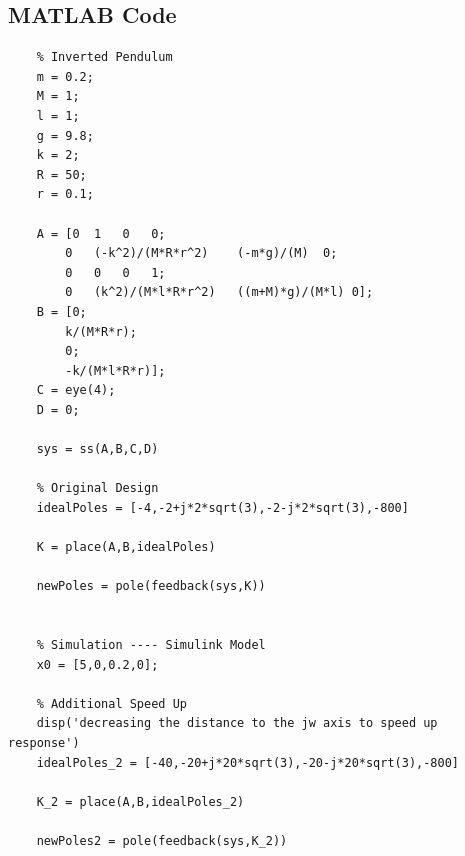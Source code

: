 \documentclass[]{article}
\begin{document}
	\subsection{MATLAB Code}
		\label{apx:PSD_MATLAB}
		\begin{Verbatim}[tabsize=4]
	% MECH 6300 - Problem Set D
	% Inverted Pendulum
	m = 0.2;
	M = 1;
	l = 1;
	g = 9.8;
	k = 2;
	R = 50;
	r = 0.1;
	
	A = [0  1   0   0;
		0   (-k^2)/(M*R*r^2)    (-m*g)/(M)  0;
		0   0   0   1;
		0   (k^2)/(M*l*R*r^2)   ((m+M)*g)/(M*l) 0];
	B = [0;
		k/(M*R*r);
		0;
		-k/(M*l*R*r)];
	C = eye(4);
	D = 0;
	
	sys = ss(A,B,C,D)
	
	% Original Design
	idealPoles = [-4,-2+j*2*sqrt(3),-2-j*2*sqrt(3),-800]
	
	K = place(A,B,idealPoles)
	
	newPoles = pole(feedback(sys,K))
	
	
	% Simulation ---- Simulink Model
	x0 = [5,0,0.2,0];
	
	% Additional Speed Up
	disp('decreasing the distance to the jw axis to speed up response')
	idealPoles_2 = [-40,-20+j*20*sqrt(3),-20-j*20*sqrt(3),-800]
	
	K_2 = place(A,B,idealPoles_2)
	
	newPoles2 = pole(feedback(sys,K_2))
		\end{Verbatim}
\end{document}

